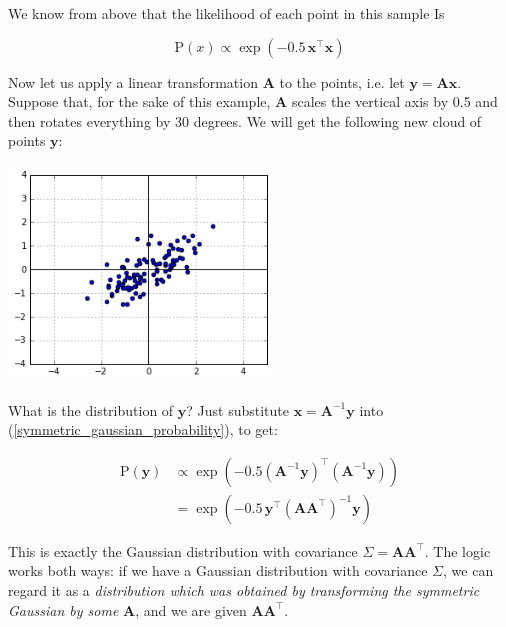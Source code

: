 \documentclass{article}
\begin{document}
We know from above that the likelihood of each point in this sample Is

\begin{equation}
  \label{symmetric_gaussian_probability}
  \text{P}(x)\propto\exp\left(-0.5\,\bm{x}^{\intercal}\bm{x}\right)
\end{equation}

Now let us apply a linear transformation $\bm{A}$ to the points, i.e. let $\bm{y} = \bm{Ax}$. Suppose that, for the sake of this example, $\bm{A}$ scales the vertical axis by 0.5 and then rotates everything by 30 degrees. We will get the following new cloud of points $\bm{y}$:

\begin{center}
  \includegraphics[width=7cm]{figs_hints_2.png}
\end{center}

What is the distribution of $\bm{y}$? Just substitute $\bm{x}=\bm{A}^{-1}\bm{y}$ into (\ref{symmetric_gaussian_probability}), to get:

\begin{equation}
  \label{eqn_gaussian_transformation}
  \begin{aligned}
    \text{P}(\bm{y}) &\propto \exp\left(-0.5\left(\bm{A}^{-1}\bm{y}\right)^{\intercal}\left(\bm{A}^{-1}\bm{y}\right)\right) \\
    &= \exp\left(-0.5\,\bm{y}^{\intercal}\left(\bm{A}\bm{A}^{\intercal}\right)^{-1}\bm{y}\right)
  \end{aligned}
\end{equation}

This is exactly the Gaussian distribution with covariance $\Sigma = \bm{A}\bm{A}^{\intercal}$. The logic works both ways: if we have a Gaussian distribution with covariance $\Sigma$, we can regard it as a \textit{distribution which was obtained by transforming the symmetric Gaussian by some} $\bm{A}$, and we are given $\bm{A}\bm{A}^{\intercal}$.\medskip
\end{document}
